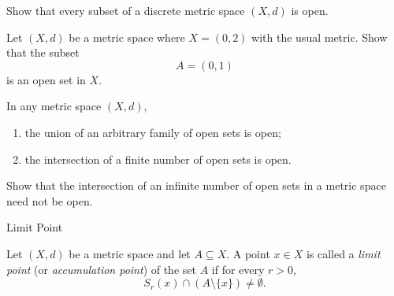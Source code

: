 \documentclass[12pt, a4paper]{article}
\begin{document}
\clearpage

\begin{problem}
Show that every subset of a discrete metric space $(X,d)$ is open.
\end{problem}

\vspace{250pt}

\begin{problem}
Let $(X,d)$ be a metric space where $X=(0,2)$ with the usual metric. Show that the subset
\[
A=(0,1)
\]
is an open set in $X$.
\end{problem}

\clearpage

\begin{theorem}
In any metric space $(X,d)$,
\begin{enumerate}
    \item the union of an arbitrary family of open sets is open;
    \item the intersection of a finite number of open sets is open.
\end{enumerate}
\end{theorem}

\clearpage

\begin{problem}
Show that the intersection of an infinite number of open sets in a metric space need not be
open.
\end{problem}

\clearpage

\begin{heading}
    Limit Point
\end{heading}

\vspace{10pt}

\begin{definition}
Let $(X,d)$ be a metric space and let $A\subseteq X$. A point $x\in X$ is called a
\emph{limit point} (or \emph{accumulation point}) of the set $A$ if for every $r>0$,
\[
S_r(x)\cap (A\setminus\{x\})\neq \emptyset.
\]
\end{definition}

\clearpage
\end{document}
